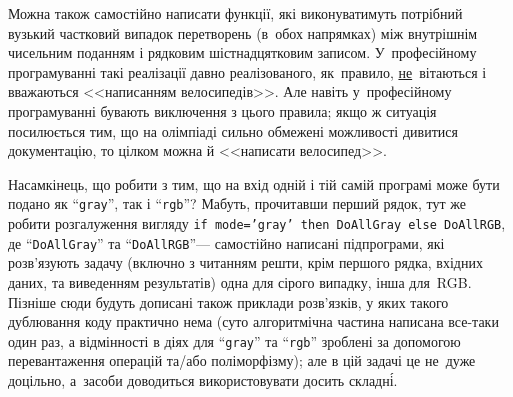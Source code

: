 Можна також самостійно написати функції, які виконуватимуть потрібний вузький частковий випадок перетворень (в~обох напрямках) між внутрішнім чисельним поданням і рядковим шістнадцятковим записом. У~професійному програмуванні такі реалізації давно реалізованого, як~правило, \underline{не}~вітаються і вважаються <<написанням велосипедів>>. Але навіть у~професійному програмуванні бувають виключення з цього правила; якщо ж ситуація посилюється тим, що на олімпіаді сильно обмежені можливості дивитися документацію, то цілком можна й <<написати велосипед>>.

Насамкінець, що робити з тим, що на вхід одній і тій самій програмі може бути подано як ``\texttt{gray}'', так і ``\texttt{rgb}''? Мабуть, прочитавши перший рядок, тут же робити розгалуження вигляду \texttt{if mode='gray' then DoAllGray else DoAllRGB}, де ``\texttt{DoAllGray}'' та ``\texttt{DoAllRGB}''\nolinebreak[3] --- самостійно написані підпрограми, які розв'язують задачу (включно з читанням решти, крім першого рядка, вхідних даних, та виведенням результатів) одна для сірого випадку, інша для~RGB. Пізніше сюди будуть дописані також приклади розв'язків, у яких такого дублювання коду практично нема (суто алгоритмічна частина написана все-таки один раз, а відмінності в діях для ``\texttt{gray}'' та ``\texttt{rgb}'' зроблені за допомогою перевантаження операцій та/або поліморфізму); але в цій задачі це не~дуже доцільно, а~засоби доводиться використовувати досить складн\'{і}. 
